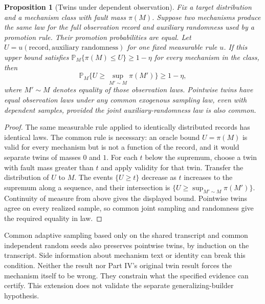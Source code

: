 \documentclass[11pt]{article}
\newtheorem{proposition}[theorem]{Proposition}
\theoremstyle{definition}
\theoremstyle{remark}
\newcommand{\Prb}{\mathbb P}
\begin{document}
\begin{proposition}[Twins under dependent observation]\label{prop:twins}
Fix a target distribution and a mechanism class with fault mass $\pi(M)$.
Suppose two mechanisms produce the same law for the full observation record and auxiliary
randomness used by a promotion rule. Their promotion probabilities are equal.
Let $U=u(\text{record},\text{auxiliary randomness})$ for one fixed measurable rule $u$.
If this upper bound satisfies
$\Prb_M\{\pi(M)\le U\}\ge1-\eta$ for every mechanism in the class, then
\[
\Prb_M\Big\{U\ge\sup_{M'\sim M}\pi(M')\Big\}\ge1-\eta,
\]
where $M'\sim M$ denotes equality of those observation laws.
Pointwise twins have equal observation laws under any common exogenous sampling law,
even with dependent samples, provided the joint auxiliary-randomness law is also common.
\end{proposition}
\begin{proof}
The same measurable rule applied to identically distributed records has identical laws.
The common rule is necessary: an oracle bound $U=\pi(M)$ is valid for every mechanism but is
not a function of the record, and it would separate twins of masses $0$ and $1$.
For each $t$ below the supremum, choose a twin with fault mass greater than $t$ and apply
validity for that twin. Transfer the distribution of $U$ to $M$. The events $\{U\ge t\}$
decrease as $t$ increases to the supremum along a sequence, and their intersection is
$\{U\ge\sup_{M'\sim M}\pi(M')\}$. Continuity of measure from above gives the displayed bound.
Pointwise twins agree on every realized sample, so common joint sampling and randomness give
the required equality in law.
\end{proof}
Common adaptive sampling based only on the shared transcript and common independent random
seeds also preserves pointwise twins, by induction on the transcript. Side information about
mechanism text or identity can break this condition. Neither the result nor Part IV's original
twin result forces the mechanism itself to be wrong. They constrain what the specified evidence
can certify. This extension does not validate the separate generalizing-builder hypothesis.
\end{document}
